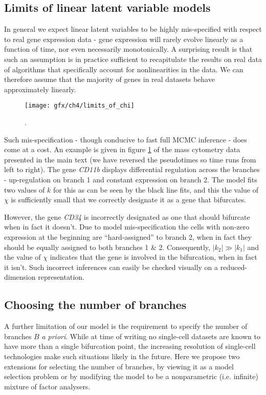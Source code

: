 \subsection{Limits of linear latent variable models}

In general we expect linear latent variables to be highly mis-specified with respect to real gene expression data - gene expression will rarely evolve linearly as a function of time, nor even necessarily monotonically. A surprising result is that such an assumption is in practice sufficient to recapitulate the results on real data of algorithms that specifically account for nonlinearities in the data. We can therefore assume that the majority of genes in real datasets behave approximately linearly.

\begin{figure}
	\centering
	\texttt{[image: gfx/ch4/limits\_of\_chi]}
	\caption{.} \label{fig:chi}
\end{figure}

Such mis-specification - though conducive to fast full MCMC inference - does come at a cost. An example is given in figure \ref{fig:chi} of the mass cytometry data presented in the main text (we have reversed the pseudotimes so time runs from left to right). The gene \emph{CD11b} displays differential regulation across the branches - up-regulation on branch 1 and constant expression on branch 2. The model fits two values of $k$ for this as can be seen by the black line fits, and this the value of $\chi$ is sufficiently small that we correctly designate it as a gene that bifurcates.

However, the gene \emph{CD34} is incorrectly designated as one that should bifurcate when in fact it doesn't. Due to model mis-specification the cells with non-zero expression at the beginning are ``hard-assigned'' to branch 2, when in fact they should be equally assigned to both branches 1 \& 2. Consequently, $|k_2| \gg |k_1|$ and the value of $\chi$ indicates that the gene is involved in the bifurcation, when in fact it isn't. Such incorrect inferences can easily be checked visually on a reduced-dimension representation.

\subsection{Choosing the number of branches}

A further limitation of our model is the requirement to specify the number of branches $B$ \emph{a priori}. While at time of writing no single-cell datasets are known to have more than a single bifurcation point, the increasing resolution of single-cell technologies make such situations likely in the future. Here we propose two extensions for selecting the number of branches, by viewing it as a model selection problem or by modifying the model to be a nonparametric (i.e. infinite) mixture of factor analysers.

